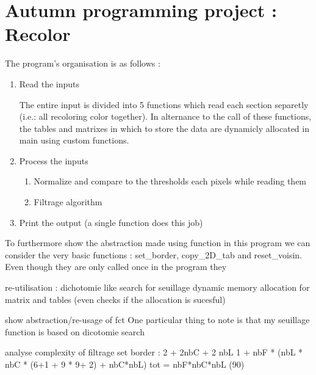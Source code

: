 \documentclass[a4paper]{report} %
\begin{document}
\section*{Autumn programming project : Recolor}
The program's organisation is as follows :
\begin{enumerate}
\item Read the inputs

The entire input is divided into 5 functions which read each section separetly (i.e.: all recoloring color together).
In alternance to the call of these functions, the tables and matrixes in which to store the data are dynamicly allocated in main using custom functions.

\item Process the inputs
    \begin{enumerate}
    \item Normalize and compare to the thresholds each pixels while reading them 
    \item Filtrage algorithm 
    \end{enumerate}
\item Print the output (a single function does this job)
\end{enumerate}

To furthermore show the abstraction made using function in this program we can consider the very basic functions : set\_border, copy\_2D\_tab and reset\_voisin.
Even though they are only called once in the program they 


re-utilisation :
dichotomie like search for seuillage
dynamic memory allocation for matrix and tables (even checks if the allocation is sucesful)

show abstraction/re-usage of fct
One particular thing to note is that my seuillage function is based on dicotomie search

analyse complexity of filtrage
set border : 2 + 2nbC + 2 nbL
1 + nbF * (nbL * nbC * (6+1 + 9 * 9+ 2) + nbC*nbL)
tot = nbF*nbC*nbL (90)
\end{document}
